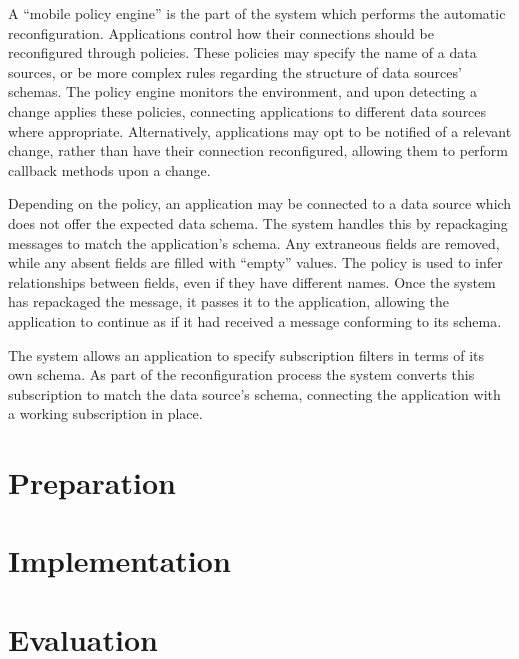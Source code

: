 \documentclass[12pt,twoside,notitlepage]{report}
\begin{document}
A ``mobile policy engine'' is the part of the system which performs the automatic reconfiguration. 
Applications control how their connections should be reconfigured through policies. 
These policies may specify the name of a data sources, or be more complex rules regarding the structure of data sources' schemas. 
The policy engine monitors the environment, and upon detecting a change applies these policies, connecting applications to different data sources where appropriate.
Alternatively, applications may opt to be notified of a relevant change, rather than have their connection reconfigured, allowing them to perform callback methods upon a change.

Depending on the policy, an application may be connected to a data source which does not offer the expected data schema. 
The system handles this by repackaging messages to match the application's schema. Any extraneous fields are removed, while any absent fields are filled with ``empty'' values. The policy is used to infer relationships between fields, even if they have different names. 
Once the system has repackaged the message, it passes it to the application, allowing the application to continue as if it had received a message conforming to its schema.

The system allows an application to specify subscription filters in terms of its own schema. 
As part of the reconfiguration process the system converts this subscription to match the data source's schema, connecting the application with a working subscription in place.

\cleardoublepage

 
\chapter{Preparation}


\cleardoublepage


\chapter{Implementation}


\cleardoublepage


\chapter{Evaluation}
\end{document}
